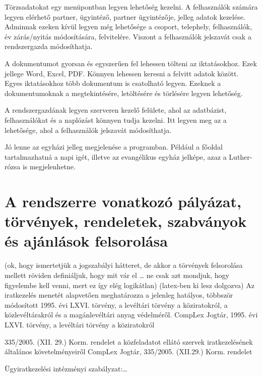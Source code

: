 \documentclass[
]{thesis-ekf}
\theoremstyle{definition}
\theoremstyle{remark}
\begin{document}
Törzsadatokat egy menüpontban legyen lehetőség kezelni. A felhasználók számára legyen elérhető partner, ügyintéző, partner ügyintézője, jelleg adatok kezelése. Adminnak ezeken kívül legyen még lehetősége a csoport, telephely, felhasználók, év zárás/nyitás módosítására, felvitelére.  Viszont a felhasználók jelszavát csak a rendszergazda módosíthatja.

A dokumentumot gyorsan és egyszerűen fel lehessen tölteni az iktatásokhoz. Ezek jellege Word, Excel, PDF. Könnyen lehessen keresni a felvitt adatok között. Egyes iktatásokhoz több dokumentum is csatolható legyen. Ezeknek a dokumentumoknak a megtekintésére, letöltésére és törlésére legyen lehetőség. 

A rendszergazdának legyen szerveren kezelő felülete, ahol az adatbázist, felhasználókat és a naplózást könnyen tudja kezelni. Itt legyen meg az a lehetősége, ahol a felhasználók jelszavát módosíthatja.

Jó lenne az egyházi jelleg megjelenése a programban. Például a főoldal tartalmazhatná a napi igét, illetve az evangélikus egyház jelképe, azaz a Luther-rózsa is megjelenhetne.
\section{A rendszerre vonatkozó pályázat, törvények, rendeletek, szabványok és ajánlások felsorolása}
(ok, hogy ismertetjük a jogszabályi hátteret, de akkor a törvények felsorolása mellett röviden definiáljuk, hogy mit vár el … ne csak azt mondjuk, hogy figyelembe kell venni, mert ez így elég logikátlan) (latex-ben ki lesz dolgozva)
Az iratkezelés menetét alapvetően meghatározza a jelenleg hatályos, többször módosított 1995. évi LXVI. törvény, a levéltári törvény a köziratokról, a közlevéltárakról és a magánlevéltári anyag védelméről. 
CompLex Jogtár, 1995. évi LXVI. törvény, a levéltári törvény a köziratokról 

335/2005. (XII. 29.) Korm. rendelet a közfeladatot ellátó szervek iratkezelésének általános követelményeiről
CompLex Jogtár, 335/2005. (XII.29.) Korm. rendelet 

Ügyiratkezelési intézményi szabályzat:…
\end{document}
